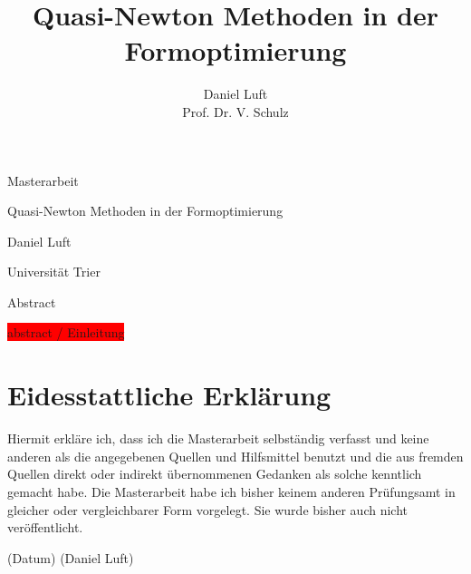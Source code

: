 \documentclass[bibliography=totoc,12pt,a4paper]{scrartcl}
\theoremstyle{exampstyle}
\numberwithin{equation}{section}
\renewenvironment{abstract}
 {\small
  \begin{center}
  \bfseries \abstractname\vspace{-.5em}\vspace{0pt}
  \end{center}
  \list{}{%
    \setlength{\leftmargin}{12mm}%
    \setlength{\rightmargin}{\leftmargin}%
  }%
  \item\relax}
 {\endlist}
\begin{document}
\title{Quasi-Newton Methoden in der Formoptimierung}

\author{Daniel Luft \\ Prof. Dr. V. Schulz}

  \pagestyle{empty}

  \begin{titlepage}

    \vspace*{2cm} 

 \begin{center} \large 
    
    Masterarbeit
    \vspace*{2cm}

    {\huge Quasi-Newton Methoden in der Formoptimierung}
    \vspace*{2.5cm}

    Daniel Luft
    \vspace*{6cm}


	Universität Trier
  \end{center}
\end{titlepage}

  \tableofcontents

\newpage

  \pagestyle{headings}
  
\begin{abstract}
Abstract
\end{abstract}
\vspace{1cm}

\colorbox{red}{abstract / Einleitung}





\newpage
\appendix
\section{Eidesstattliche Erklärung}
Hiermit erkläre ich, dass ich die Masterarbeit selbständig verfasst und keine anderen als die angegebenen Quellen und Hilfsmittel benutzt und die aus fremden Quellen direkt oder indirekt übernommenen
Gedanken als solche kenntlich gemacht habe. Die Masterarbeit habe ich bisher keinem anderen Prüfungsamt in gleicher oder vergleichbarer Form vorgelegt. Sie wurde bisher auch nicht veröffentlicht.
\vspace{1.5cm}

(Datum) \hspace{9cm} (Daniel Luft)


\newpage
\nocite{*}


\end{document}
